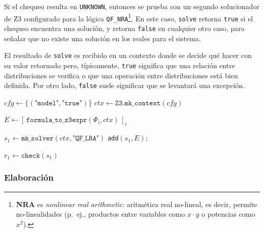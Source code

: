 Si el chequeo resulta en \verb|UNKNOWN|, entonces se prueba con un
segundo solucionador de Z3 configurado para la lógica
\texttt{QF\_NRA}\footnote{\textbf{NRA} es \emph{nonlinear real
    arithmetic}: aritmética real no-lineal, es decir, permite
  no-linealidades (p.\ ej., productos entre variables como $x\cdot y$
  o potencias como $x^2$).}.  En este caso, \verb|solve| retorna
\verb|true| si el chequeo encuentra una solución, y retorna
\verb|false| en cualquier otro caso, para señalar que no existe una
solución en los reales para el sistema.


El resultado de \verb|solve| es recibido en un contexto donde se decide
qué hacer con su valor retornado pero, típicamente, \verb|true|
significa que una relación entre distribuciones se verifica o que una
operación entre distribuciones está bien definida. Por otro lado,
\verb|false| suele significar que se levantará una excepción.

\begin{algorithm}[H]
\caption{\texttt{solve}}
\label{alg:solve}

$\mathit{cfg} \leftarrow \{(\texttt{"model"},\texttt{"true"})\}$
$ctx \leftarrow \texttt{Z3.mk\_context}(\mathit{cfg})$

$E \leftarrow [\,\texttt{formula\_to\_z3expr}(\Phi_i,ctx)\,]_i$

$s_1 \leftarrow \texttt{mk\_solver}(ctx,\texttt{"QF\_LRA"})$
\texttt{add}$(s_1, E)$;

$r_1 \leftarrow \texttt{check}(s_1)$\;

\end{algorithm}




\subsubsection{Elaboración}
\label{sec:impl-rutinas-elaboracion}

